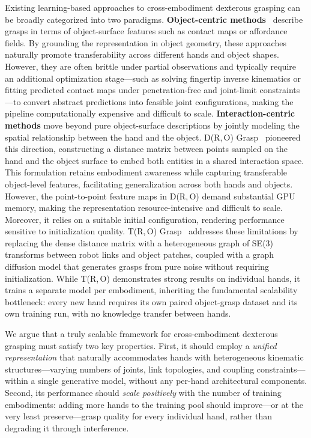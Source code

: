 Existing learning-based approaches to cross-embodiment dexterous grasping can be broadly categorized into two paradigms.
%
\textbf{Object-centric methods}~\cite{li2023gendexgrasp,chen2024multihandgrasp,liu2023contactgen} describe grasps in terms of object-surface features such as contact maps or affordance fields.
By grounding the representation in object geometry, these approaches naturally promote transferability across different hands and object shapes.
However, they are often brittle under partial observations and typically require an additional optimization stage---such as solving fingertip inverse kinematics or fitting predicted contact maps under penetration-free and joint-limit constraints---to convert abstract predictions into feasible joint configurations, making the pipeline computationally expensive and difficult to scale.
%
\textbf{Interaction-centric methods} move beyond pure object-surface descriptions by jointly modeling the spatial relationship between the hand and the object.
D(R,\,O) Grasp~\cite{chen2024dro} pioneered this direction, constructing a distance matrix between points sampled on the hand and the object surface to embed both entities in a shared interaction space.
This formulation retains embodiment awareness while capturing transferable object-level features, facilitating generalization across both hands and objects.
However, the point-to-point feature maps in D(R,\,O) demand substantial GPU memory, making the representation resource-intensive and difficult to scale.
Moreover, it relies on a suitable initial configuration, rendering performance sensitive to initialization quality.
T(R,\,O) Grasp~\cite{chen2024tro} addresses these limitations by replacing the dense distance matrix with a heterogeneous graph of SE(3) transforms between robot links and object patches, coupled with a graph diffusion model that generates grasps from pure noise without requiring initialization.
While T(R,\,O) demonstrates strong results on individual hands, it trains a separate model per embodiment, inheriting the fundamental scalability bottleneck: every new hand requires its own paired object-grasp dataset and its own training run, with no knowledge transfer between hands.

We argue that a truly scalable framework for cross-embodiment dexterous grasping must satisfy two key properties.
First, it should employ a \emph{unified representation} that naturally accommodates hands with heterogeneous kinematic structures---varying numbers of joints, link topologies, and coupling constraints---within a single generative model, without any per-hand architectural components.
Second, its performance should \emph{scale positively} with the number of training embodiments: adding more hands to the training pool should improve---or at the very least preserve---grasp quality for every individual hand, rather than degrading it through interference.

